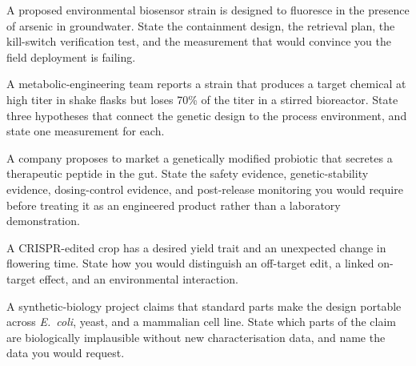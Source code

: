 \begin{exercise}
A proposed environmental biosensor strain is designed to fluoresce in
the presence of arsenic in groundwater. State the containment design,
the retrieval plan, the kill-switch verification test, and the
measurement that would convince you the field deployment is failing.
\end{exercise}

\begin{exercise}
A metabolic-engineering team reports a strain that produces a target
chemical at high titer in shake flasks but loses 70\% of the titer in
a stirred bioreactor. State three hypotheses that connect the genetic
design to the process environment, and state one measurement for each.
\end{exercise}

\begin{exercise}
A company proposes to market a genetically modified probiotic that
secretes a therapeutic peptide in the gut. State the safety evidence,
genetic-stability evidence, dosing-control evidence, and post-release
monitoring you would require before treating it as an engineered
product rather than a laboratory demonstration.
\end{exercise}

\begin{exercise}
A CRISPR-edited crop has a desired yield trait and an unexpected
change in flowering time. State how you would distinguish an off-target
edit, a linked on-target effect, and an environmental interaction.
\end{exercise}

\begin{exercise}
A synthetic-biology project claims that standard parts make the design
portable across \emph{E.\ coli}, yeast, and a mammalian cell line.
State which parts of the claim are biologically implausible without
new characterisation data, and name the data you would request.
\end{exercise}
